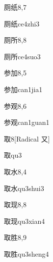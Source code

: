 \begin{entry}{厕纸}{8,7}
  \begin{phonetics}{厕纸}{ce4zhi3}
  \end{phonetics}
\end{entry}

\begin{entry}{厕所}{8,8}
  \begin{phonetics}{厕所}{ce4suo3}
  \end{phonetics}
\end{entry}

\begin{entry}{参加}{8,5}
  \begin{phonetics}{参加}{can1jia1}
  \end{phonetics}
\end{entry}

\begin{entry}{参观}{8,6}
  \begin{phonetics}{参观}{can1guan1}
  \end{phonetics}
\end{entry}

\begin{entry}{取}{8}[Radical 又]
  \begin{phonetics}{取}{qu3}
  \end{phonetics}
\end{entry}

\begin{entry}{取水}{8,4}
  \begin{phonetics}{取水}{qu3shui3}
  \end{phonetics}
\end{entry}

\begin{entry}{取现}{8,8}
  \begin{phonetics}{取现}{qu3xian4}
  \end{phonetics}
\end{entry}

\begin{entry}{取胜}{8,9}
  \begin{phonetics}{取胜}{qu3sheng4}
  \end{phonetics}
\end{entry}

